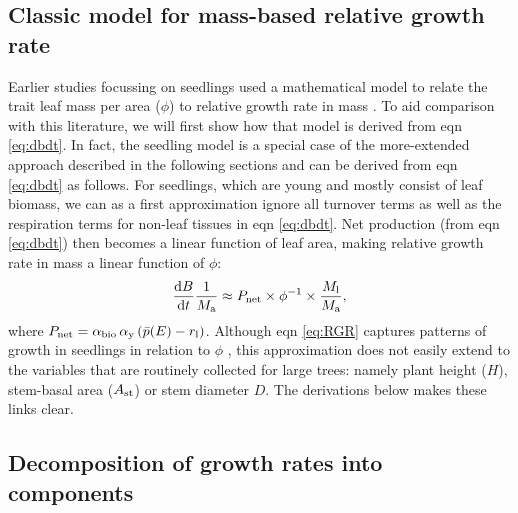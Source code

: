 \documentclass[a4paper,11pt]{article}
\begin{document}
\subsection{Classic model for mass-based relative growth rate}

Earlier studies focussing on seedlings used a mathematical model to relate the trait leaf mass per area ($\phi$) to relative growth rate in mass \citep{Blackman-1919, Lambers-1992, Cornelissen-1996, Wright-2000}. To aid comparison with this literature, we will first show how that model is derived from eqn \ref{eq:dbdt}. In fact, the seedling model is a special case of the more-extended approach described in the following sections and can be derived from eqn \ref{eq:dbdt} as follows. For seedlings, which are young and mostly consist of leaf biomass, we can as a first approximation ignore all turnover terms as well as the respiration terms for non-leaf tissues in eqn \ref{eq:dbdt}. Net production (from eqn \ref{eq:dbdt}) then becomes a linear function of leaf area, making relative growth rate in mass a linear function of $\phi$:
\begin{equation}\label{eq:RGR}
\frac{{\rm d}B}{{\rm d}t}\frac{1}{M_{\rm a}}  \approx P_{\rm net} \times \phi^{-1} \times \frac{M_{\rm l}}{M_{\rm a}}, \end{equation}
where $P_{\rm net} = \alpha_{\rm bio} \, \alpha_{\rm y}\,(\bar{p}(E) - r_{\rm l})$. Although eqn \ref{eq:RGR} captures patterns of growth in seedlings in relation to $\phi$ \citep{Wright-2000}, this approximation does not easily extend to the variables that are routinely collected for large trees: namely plant height ($H$), stem-basal area ($A_{\rm st}$) or stem diameter $D$. The derivations below makes these links clear.

\subsection{Decomposition of growth rates into components}

\setcounter{equation}{9}
\end{document}
